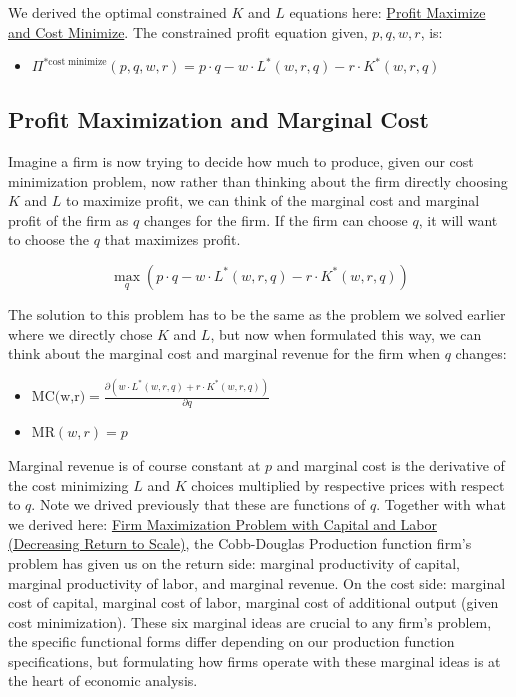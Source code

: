 \documentclass[
]{book}
\providecommand{\tightlist}{%
  \setlength{\itemsep}{0pt}\setlength{\parskip}{0pt}}
\begin{document}
We derived the optimal constrained \(K\) and \(L\) equations here: \href{https://math4econ.github.io/opti_firm_constrained/profit_maximize.html}{Profit
Maximize and Cost
Minimize}.
The constrained profit equation given, \(p,q,w,r\), is:

\begin{itemize}
\tightlist
\item
  \(\displaystyle \Pi^{*\textrm{cost}\;\textrm{minimize}} (p,q,w,r)=p\cdot q-w\cdot L^* (w,r,q)-r\cdot K^* (w,r,q)\)
\end{itemize}

\hypertarget{profit-maximization-and-marginal-cost}{%
\subsection{Profit Maximization and Marginal Cost}\label{profit-maximization-and-marginal-cost}}

Imagine a firm is now trying to decide how much to produce, given our
cost minimization problem, now rather than thinking about the firm
directly choosing \(K\) and \(L\) to maximize profit, we can think of the
marginal cost and marginal profit of the firm as \(q\) changes for the
firm. If the firm can choose \(q\), it will want to choose the \(q\) that
maximizes profit.

\[\max_q \left(p\cdot q-w\cdot L^* (w,r,q)-r\cdot K^* (w,r,q)\right)\]

The solution to this problem has to be the same as the problem we solved
earlier where we directly chose \(K\) and \(L\), but now when formulated
this way, we can think about the marginal cost and marginal revenue for
the firm when \(q\) changes:

\begin{itemize}
\item
  \(\displaystyle \textrm{MC(w,r)}=\frac{\partial (w\cdot L^* (w,r,q)+r\cdot K^* (w,r,q))}{\partial q}\)
\item
  \(\displaystyle \textrm{MR}(w,r)=p\)
\end{itemize}

Marginal revenue is of course constant at \(p\) and marginal cost is the
derivative of the cost minimizing \(L\) and \(K\) choices multiplied by
respective prices with respect to \(q\). Note we drived previously that
these are functions of \(q\). Together with what we derived here: \href{https://math4econ.github.io/matrix_application/KL_borrowhire_firm.html}{Firm
Maximization Problem with Capital and Labor (Decreasing Return to
Scale)},
the Cobb-Douglas Production function firm's problem has given us on the
return side: marginal productivity of capital, marginal productivity of
labor, and marginal revenue. On the cost side: marginal cost of capital,
marginal cost of labor, marginal cost of additional output (given cost
minimization). These six marginal ideas are crucial to any firm's
problem, the specific functional forms differ depending on our
production function specifications, but formulating how firms operate
with these marginal ideas is at the heart of economic analysis.
\end{document}
